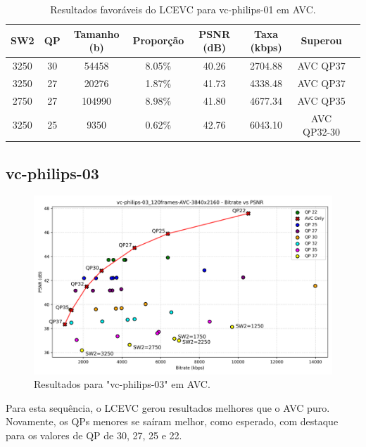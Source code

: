 \begin{table}[h]
    \centering
    \label{tab:vc-philips-01-avc-philips}
    \begin{tabular}{|c|c|c|c|c|c|c|c|}
        \hline
        \textbf{SW2} & \textbf{QP} & \textbf{Tamanho (b)} & \textbf{Proporção} & \textbf{PSNR (dB)} & \textbf{Taxa (kbps)} & \textbf{Superou} \\
        \hline
        3250 & 30 & 54458 & 8.05\% & 40.26 & 2704.88 & AVC QP37 \\
        3250 & 27 & 20276 & 1.87\% & 41.73 & 4338.48 & AVC QP37 \\
        2750 & 27 & 104990 & 8.98\% & 41.80 & 4677.34 & AVC QP35 \\
        3250 & 25 & 9350 & 0.62\% & 42.76 & 6043.10 & AVC QP32-30 \\
        \hline
    \end{tabular}
    \caption{Resultados favoráveis do LCEVC para vc-philips-01 em AVC.}
\end{table}

\newpage
\subsection{vc-philips-03}

\begin{figure}[h]
    \centering
    \includegraphics[width=1.0\textwidth]{img/vc-philips-03_120frames-AVC.png}
    \caption{Resultados para "vc-philips-03" em \acrshort{AVC}.}
    \label{fig:vc-philips-03}
\end{figure}

Para esta sequência, o \acrshort{LCEVC} gerou resultados melhores que o \acrshort{AVC}
puro. Novamente, os QPs menores se saíram melhor, como esperado, com destaque para os
valores de QP de 30, 27, 25 e 22.

